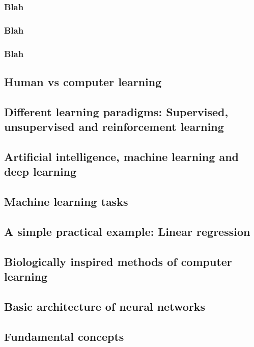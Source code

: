 \subsubsection{Blah}
\subsubsection{Blah}
\subsubsection{Blah}


\subsection{Human vs computer learning}

\subsection{Different learning paradigms: Supervised, unsupervised and reinforcement learning}

\subsection{Artificial intelligence, machine learning and deep learning}

\subsection{Machine learning tasks}

\subsection{A simple practical example: Linear regression}

\subsection{Biologically inspired methods of computer learning}

\subsection{Basic architecture of neural networks}

\subsection{Fundamental concepts}



